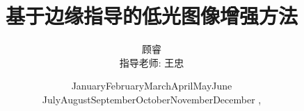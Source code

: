 \documentclass[CJK,aspectratio=169]{beamer}  %
\begin{document}
	
	\title{基于边缘指导的低光图像增强方法}
	\author[Gu Rui (LZU) 中期考核汇报]{顾睿 \\
		指导老师: 王忠}
	
	\newcommand{\monthname}[1][\the\month]{%
		\ifcase#1\or
		January\or February\or March\or April\or May\or June\or
		July\or August\or September\or October\or November\or December\fi}
		
	\renewcommand{\today}{\monthname[\the\month] \the\day, \the\year}
	\renewcommand{\figurename}{图}
	\renewcommand{\tablename}{表}
	\renewcommand{\refname}{References}
	\date{\today}
	
	\begin{frame}
		\titlepage
	\end{frame}
	
	\begin{frame}
			\small \tableofcontents
	\end{frame}
	
%		
%			
	
\end{document}
